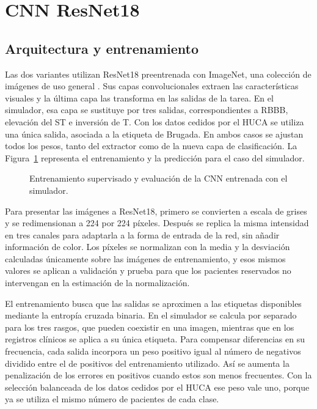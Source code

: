 \section{CNN ResNet18}
\label{chap:cnn_enfoque}

\subsection{Arquitectura y entrenamiento}
\label{sec:cnn_entrenamiento}

Las dos variantes utilizan ResNet18 preentrenada con ImageNet, una colección de imágenes de uso general \cite{he2016}. Sus capas convolucionales extraen las características visuales y la última capa las transforma en las salidas de la tarea. En el simulador, esa capa se sustituye por tres salidas, correspondientes a RBBB, elevación del ST e inversión de T. Con los datos cedidos por el HUCA se utiliza una única salida, asociada a la etiqueta de Brugada. En ambos casos se ajustan todos los pesos, tanto del extractor como de la nueva capa de clasificación. La Figura~\ref{fig:cnn_convolutional_pipeline} representa el entrenamiento y la predicción para el caso del simulador.

\begin{figure}[H]
  \centering
  \caption{Entrenamiento supervisado y evaluación de la CNN entrenada con el simulador.}
  \label{fig:cnn_convolutional_pipeline}
\end{figure}

Para presentar las imágenes a ResNet18, primero se convierten a escala de grises y se redimensionan a 224 por 224 píxeles. Después se replica la misma intensidad en tres canales para adaptarla a la forma de entrada de la red, sin añadir información de color. Los píxeles se normalizan con la media y la desviación calculadas únicamente sobre las imágenes de entrenamiento, y esos mismos valores se aplican a validación y prueba para que los pacientes reservados no intervengan en la estimación de la normalización.

\begin{samepage}
El entrenamiento busca que las salidas se aproximen a las etiquetas disponibles mediante la entropía cruzada binaria. En el simulador se calcula por separado para los tres rasgos, que pueden coexistir en una imagen, mientras que en los registros clínicos se aplica a su única etiqueta. Para compensar diferencias en su frecuencia, cada salida incorpora un peso positivo igual al número de negativos dividido entre el de positivos del entrenamiento utilizado. Así se aumenta la penalización de los errores en positivos cuando estos son menos frecuentes. Con la selección balanceada de los datos cedidos por el HUCA ese peso vale uno, porque ya se utiliza el mismo número de pacientes de cada clase.
\par
\end{samepage}

